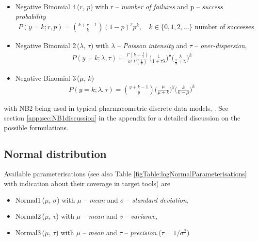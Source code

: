 {\begin{itemize}
\item
Negative Binomial 4\,($r$, $p$) with r -- \emph{number of failures} and p -- \emph{success probability}
\begin{align}
P(y=k;r,p) = \binom {k+r-1}k (1-p)^r p^k, \quad k\in \{0,1,2,\dots \} \text{ number of successes} \nonumber
\end{align}

\item
Negative Binomial 2\,($\lambda$, $\tau$) with $\lambda$ -- \emph{Poisson intensity} and $\tau$ -- \emph{over-dispersion},
\begin{align}
P(y=k;\lambda,\tau) = \frac{\Gamma(k+\frac{1}{\tau})}{k!\; \Gamma(\frac{1}{\tau})} \Big(\frac{1}{1+\tau \lambda} \Big)^{\frac{1}{\tau}} \Big(\frac{\lambda}{\frac{1}{\tau} + \lambda} \Big)^{k} \nonumber
\end{align}

\item
Negative Binomial 3\,($\mu$, $k$) %
\begin{align}
P(y=k;\lambda,\tau) = \binom {y+k-1}y \Big(\frac{\mu}{\mu + k} \Big)^{y} \Big(\frac{k}{k + \mu} \Big)^{k} \nonumber
\end{align}
\end{itemize}
with NB2 being used in typical pharmacometric discrete data models, \cite{Plan:2009fk, Troconiz:2009fv}.
See section \ref{app:sec:NB1discussion} in the appendix for a detailed discussion on the possible formulations. 

\subsection{Normal distribution}
Available parameterisations (see also Table \ref{figTable:logNormalParameterisations} 
with indication about their coverage in target tools) are
\begin{itemize}
\item
Normal1\,($\mu$, $\sigma$) with $\mu$ -- \emph{mean} and $\sigma$ -- \emph{standard deviation}, 
\item
Normal2\,($\mu$, \emph{v}) with $\mu$ -- \emph{mean} and \emph{v} -- \emph{variance},
\item
Normal3\,($\mu$, $\tau$) with $\mu$ -- \emph{mean} and $\tau$ -- \emph{precision} ($\tau=1/\sigma^2$)
\end{itemize}

}
